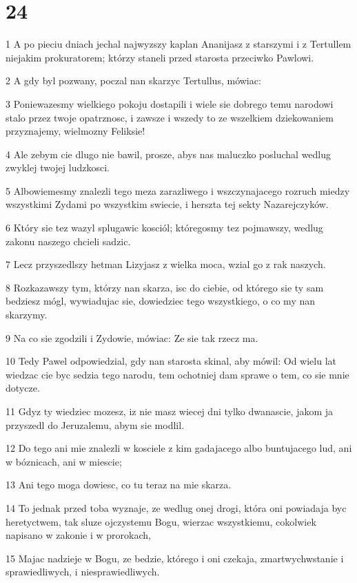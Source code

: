 \chapter{24}

\par 1 A po pieciu dniach jechal najwyzszy kaplan Ananijasz z starszymi i z Tertullem niejakim prokuratorem; którzy staneli przed starosta przeciwko Pawlowi.
\par 2 A gdy byl pozwany, poczal nan skarzyc Tertullus, mówiac:
\par 3 Poniewazesmy wielkiego pokoju dostapili i wiele sie dobrego temu narodowi stalo przez twoje opatrznosc, i zawsze i wszedy to ze wszelkiem dziekowaniem przyznajemy, wielmozny Feliksie!
\par 4 Ale zebym cie dlugo nie bawil, prosze, abys nas maluczko posluchal wedlug zwyklej twojej ludzkosci.
\par 5 Albowiemesmy znalezli tego meza zarazliwego i wszczynajacego rozruch miedzy wszystkimi Zydami po wszystkim swiecie, i herszta tej sekty Nazarejczyków.
\par 6 Który sie tez wazyl splugawic kosciól; któregosmy tez pojmawszy, wedlug zakonu naszego chcieli sadzic.
\par 7 Lecz przyszedlszy hetman Lizyjasz z wielka moca, wzial go z rak naszych.
\par 8 Rozkazawszy tym, którzy nan skarza, isc do ciebie, od którego sie ty sam bedziesz mógl, wywiadujac sie, dowiedziec tego wszystkiego, o co my nan skarzymy.
\par 9 Na co sie zgodzili i Zydowie, mówiac: Ze sie tak rzecz ma.
\par 10 Tedy Pawel odpowiedzial, gdy nan starosta skinal, aby mówil: Od wielu lat wiedzac cie byc sedzia tego narodu, tem ochotniej dam sprawe o tem, co sie mnie dotycze.
\par 11 Gdyz ty wiedziec mozesz, iz nie masz wiecej dni tylko dwanascie, jakom ja przyszedl do Jeruzalemu, abym sie modlil.
\par 12 Do tego ani mie znalezli w kosciele z kim gadajacego albo buntujacego lud, ani w bóznicach, ani w miescie;
\par 13 Ani tego moga dowiesc, co tu teraz na mie skarza.
\par 14 To jednak przed toba wyznaje, ze wedlug onej drogi, która oni powiadaja byc heretyctwem, tak sluze ojczystemu Bogu, wierzac wszystkiemu, cokolwiek napisano w zakonie i w prorokach,
\par 15 Majac nadzieje w Bogu, ze bedzie, którego i oni czekaja, zmartwychwstanie i sprawiedliwych, i niesprawiedliwych.
